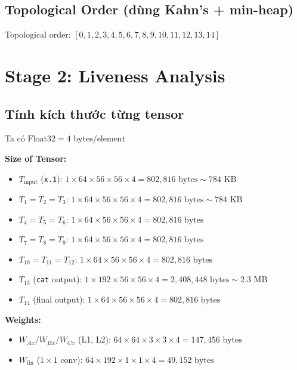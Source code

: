 \documentclass[11pt,a4paper]{article}
\begin{document}
\subsection{Topological Order (dùng Kahn's + min-heap)}

Topological order: $[0, 1, 2, 3, 4, 5, 6, 7, 8, 9, 10, 11, 12, 13, 14]$

\section{Stage 2: Liveness Analysis}

\subsection{Tính kích thước từng tensor}

Ta có $\text{Float32} = 4\text{ bytes/element}$

\textbf{Size of Tensor:}
\begin{itemize}
    \item $T_{\text{input}}$ (\texttt{x.1}): $1 \times 64 \times 56 \times 56 \times 4 = 802,816\text{ bytes} \sim 784\text{ KB}$
    \item $T_1 = T_2 = T_3$: $1 \times 64 \times 56 \times 56 \times 4 = 802,816\text{ bytes} \sim 784\text{ KB}$
    \item $T_4 = T_5 = T_6$: $1 \times 64 \times 56 \times 56 \times 4 = 802,816\text{ bytes}$
    \item $T_7 = T_8 = T_9$: $1 \times 64 \times 56 \times 56 \times 4 = 802,816\text{ bytes}$
    \item $T_{10} = T_{11} = T_{12}$: $1 \times 64 \times 56 \times 56 \times 4 = 802,816\text{ bytes}$
    \item $T_{13}$ (\texttt{cat} output): $1 \times 192 \times 56 \times 56 \times 4 = 2,408,448\text{ bytes} \sim 2.3\text{ MB}$
    \item $T_{14}$ (final output): $1 \times 64 \times 56 \times 56 \times 4 = 802,816\text{ bytes}$
\end{itemize}

\textbf{Weights:}
\begin{itemize}
    \item $W_{Ax} / W_{Bx} / W_{Cx}$ (L1, L2): $64 \times 64 \times 3 \times 3 \times 4 = 147,456\text{ bytes}$
    \item $W_{\text{fin}}$ ($1\times 1$ conv): $64 \times 192 \times 1 \times 1 \times 4 = 49,152\text{ bytes}$
\end{itemize}
\end{document}
